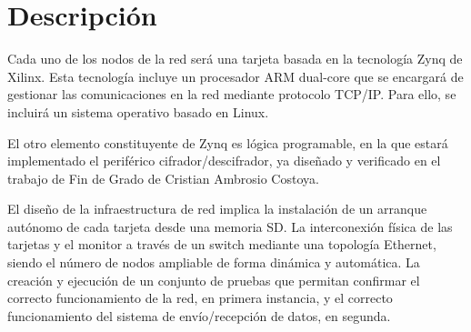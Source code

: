 \section{Descripción}
Cada uno de los nodos de la red será una tarjeta basada en la tecnología Zynq de Xilinx. Esta tecnología incluye un procesador ARM dual-core que se encargará de gestionar las
comunicaciones en la red mediante protocolo TCP/IP. Para ello, se incluirá un sistema operativo basado en Linux.

El otro elemento constituyente de Zynq es lógica programable, en la que estará implementado el periférico cifrador/descifrador, ya diseñado y verificado en el trabajo de Fin de Grado de Cristian Ambrosio Costoya.

El diseño de la infraestructura de red implica la instalación de un arranque autónomo de cada tarjeta desde una memoria SD. La interconexión física de las tarjetas y el monitor a través de
un switch mediante una topología Ethernet, siendo el número de nodos ampliable de forma dinámica y automática. La creación y ejecución de un conjunto de pruebas que permitan confirmar
el correcto funcionamiento de la red, en primera instancia, y el correcto funcionamiento del sistema de envío/recepción de datos, en segunda.